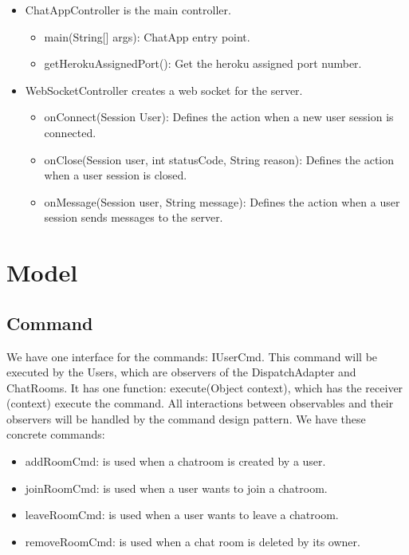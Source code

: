\documentclass[letterpaper, 11pt]{article}
\begin{document}
\begin{itemize}
\item ChatAppController is the main controller.
\begin{itemize}
  \item main(String[] args): ChatApp entry point.
  \item getHerokuAssignedPort(): Get the heroku assigned port number.
\end{itemize}

\item WebSocketController creates a web socket for the server. 
\begin{itemize}
 \item onConnect(Session User): Defines the action when a new user session is connected.
\item onClose(Session user, int statusCode, String reason): Defines the action when a user session is closed.
\item onMessage(Session user, String message): Defines the action when a user session sends messages to the server.
\end{itemize}
\end{itemize}

\section{Model}
\subsection{Command}
We have one interface for the commands: IUserCmd. This command will be executed by the Users, which are observers of the DispatchAdapter and ChatRooms. It has one function: execute(Object context), which has the receiver (context) execute the command. All interactions between observables and their observers will be handled by the command design pattern. We have these concrete commands:
\begin{itemize}
\item addRoomCmd: is used when a chatroom is created by a user.
\item joinRoomCmd: is used when a user wants to join a chatroom.
\item leaveRoomCmd: is used when a user wants to leave a chatroom.
\item removeRoomCmd: is used when a chat room is deleted by its owner.
\end{itemize}
\end{document}
